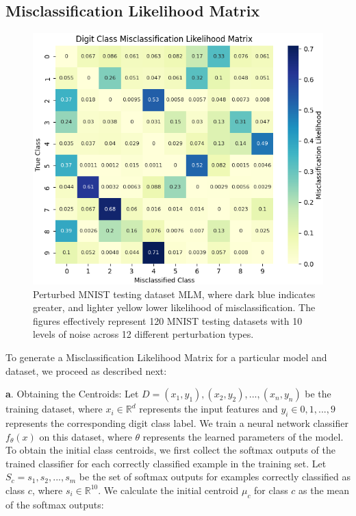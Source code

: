 \subsection{Misclassification Likelihood Matrix}
\label{miss_class_matrix}

\begin{figure}[h]
    \centering
    \includegraphics[width=0.99\columnwidth]{Figures/DigitClassMisclassificationLikelihoodMatrix.png}   
    \caption{Perturbed MNIST testing dataset MLM, where dark blue indicates greater, and lighter yellow lower likelihood of misclassification. The figures effectively represent 120 MNIST testing datasets with 10 levels of noise across 12 different perturbation types.} 
    \label{fig:DigitClassMisclassificationLikelihoodMatrix}
\end{figure}

To generate a Misclassification Likelihood Matrix for a particular model and dataset, we proceed as described next:

\textbf{a}. Obtaining the Centroids:
Let $ D = {(x_1, y_1), (x_2, y_2), ..., (x_n, y_n)} $ be the training dataset, where $ x_i \in \mathbb{R}^d $ represents the input features and $y_i \in {0, 1, ..., 9}$ represents the corresponding digit class label. We train a neural network classifier $f_\theta(x)$ on this dataset, where $\theta$ represents the learned parameters of the model.
To obtain the initial class centroids, we first collect the softmax outputs of the trained classifier for each correctly classified example in the training set. Let $S_c = {s_1, s_2, ..., s_m}$ be the set of softmax outputs for examples correctly classified as class $c$, where $s_i \in \mathbb{R}^{10}$. We calculate the initial centroid $\mu_c$ for class $c$ as the mean of the softmax outputs:

